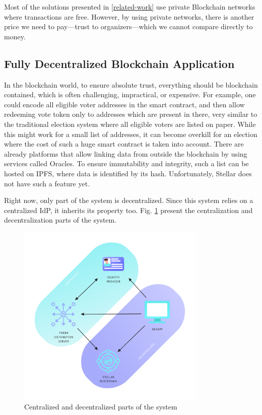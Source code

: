 \documentclass[applsci,article,submit,moreauthors,pdftex]{Definitions/mdpi}
\begin{document}
Most of the solutions presented in \ref{related-work} use private Blockchain networks where transactions are free. However, by using private networks, there is another price we need to pay––trust to organizers––which we cannot compare directly to money.


\subsection{Fully Decentralized Blockchain Application}
\label{dapp}

In the blockchain world, to ensure absolute trust, everything should be blockchain contained, which is often challenging, impractical, or expensive. For example, one could encode all eligible voter addresses in the smart contract, and then allow redeeming vote token only to addresses which are present in there, very similar to the traditional election system where all eligible voters are listed on paper. While this might work for a small list of addresses, it can become overkill for an election where the cost of such a huge smart contract is taken into account. There are already platforms that allow linking data from outside the blockchain by using services called Oracles. To ensure immutability and integrity, such a list can be hosted on IPFS, where data is identified by its hash. Unfortunately, Stellar does not have such a feature yet. 

Right now, only part of the system is decentralized. Since this system relies on a centralized IdP, it inherits its property too. Fig. \ref{fig:decentralization} present the centralization and decentralization parts of the system.

\begin{figure}[h!]
\includegraphics[width=9cm]{figs/stellot-decentralization.png}
\centering
\caption{Centralized and decentralized parts of the system}
\label{fig:decentralization}
\end{figure}
\end{document}
